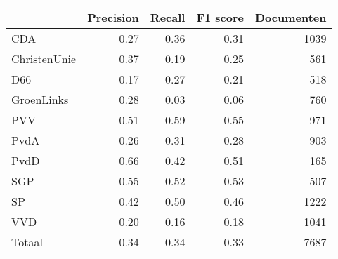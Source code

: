 \begin{tabular}{lrrrr}
\toprule
{} &  Precision &  Recall &  F1 score &  Documenten \\
\midrule
CDA          &       0.27 &    0.36 &      0.31 &        1039 \\
ChristenUnie &       0.37 &    0.19 &      0.25 &         561 \\
D66          &       0.17 &    0.27 &      0.21 &         518 \\
GroenLinks   &       0.28 &    0.03 &      0.06 &         760 \\
PVV          &       0.51 &    0.59 &      0.55 &         971 \\
PvdA         &       0.26 &    0.31 &      0.28 &         903 \\
PvdD         &       0.66 &    0.42 &      0.51 &         165 \\
SGP          &       0.55 &    0.52 &      0.53 &         507 \\
SP           &       0.42 &    0.50 &      0.46 &        1222 \\
VVD          &       0.20 &    0.16 &      0.18 &        1041 \\
Totaal       &       0.34 &    0.34 &      0.33 &        7687 \\
\bottomrule
\end{tabular}
